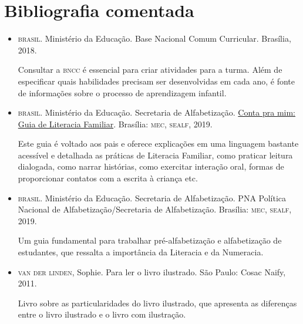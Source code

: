 \documentclass[11pt]{extarticle}
\begin{document}
\section{Bibliografia comentada}

\begin{itemize}
\item \textsc{brasil}. Ministério da Educação. Base Nacional Comum Curricular. Brasília, 2018.

Consultar a \textsc{bncc} é essencial para criar atividades para a turma. Além de especificar 
quais habilidades precisam ser desenvolvidas em cada ano, é fonte de informações sobre 
o processo de aprendizagem infantil. 

\item \textsc{brasil}. Ministério da Educação. Secretaria de Alfabetização. \href{http://alfabetizacao.mec.gov.br/images/conta-pra-mim/conta-pra-mim-literacia.pdf}{Conta pra mim: Guia de Literacia Familiar}. 
Brasília: \textsc{mec, sealf}, 2019. 

Este guia é voltado aos pais e oferece explicações em uma linguagem bastante acessível e detalhada as práticas de Literacia Familiar, 
como praticar leitura dialogada, como narrar histórias, como exercitar interação oral, formas de proporcionar contatos com a escrita à criança etc. 
 
\item \textsc{brasil}. Ministério da Educação. Secretaria de Alfabetização. PNA Política Nacional de Alfabetização/Secretaria 
de Alfabetização. Brasília: \textsc{mec, sealf}, 2019.

Um guia fundamental para trabalhar pré-alfabetização e alfabetização de estudantes, que ressalta a importância da Literacia e da Numeracia. 

\item \textsc{van der linden}, Sophie. Para ler o livro ilustrado. São Paulo: Cosac Naify, 2011.

Livro sobre as particularidades do livro ilustrado, que apresenta as diferenças entre o livro ilustrado e o livro com ilustração. 
\end{itemize}
\end{document}
